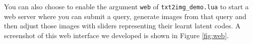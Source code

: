 \documentclass{article}
\begin{document}
You can also choose to enable the argument \texttt{web} of \texttt{txt2img\_demo.lua} to start a web server where you can submit a query, generate images from that query and then adjust those images with sliders representing their learnt latent codes. A screenshot of this web interface we developed is shown in Figure \ref{fig:web}.


\small

\end{document}
